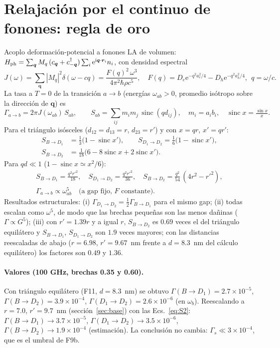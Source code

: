 \documentclass[11pt,a4paper]{article}
\newcommand{\ee}{\mathrm{e}}
\newcommand{\ii}{\mathrm{i}}
\newcommand{\wb}{\omega_b}
\DeclareMathOperator{\sinc}{sinc}
\begin{document}
\section{Relajación por el continuo de fonones: regla de oro}\label{sec:continuo}
Acoplo deformación-potencial a fonones LA de volumen:
$H_{\rm ph}=\sum_{\bm q}M_q\,(c_{\bm q}+c_{-\bm q}^\dagger)\sum_i\ee^{\ii\bm q\cdot\bm r_i}n_i$, con densidad espectral
\begin{equation}
J(\omega)=\sum_{\bm q}|M_q|^2\delta(\omega-cq)=\frac{F(q)^2\,\omega^3}{4\pi^2\hbar\rho c^5},\quad
F(q)=D_e\ee^{-q^2a_e^2/4}-D_h\ee^{-q^2a_h^2/4},\ \ q=\omega/c .
\end{equation}
La tasa a $T=0$ de la transición $a\to b$ (energías $\omega_{ab}>0$, promedio isótropo sobre la dirección de $\bm q$) es
\begin{equation}
\Gamma_{a\to b}=2\pi J(\omega_{ab})\,S_{ab},\qquad
S_{ab}=\sum_{ij}m_im_j\,\sinc(qd_{ij}),\quad m_i=a_ib_i,\quad\sinc x=\tfrac{\sin x}{x}. \label{eq:golden}
\end{equation}
Para el triángulo isósceles ($d_{12}=d_{13}=r$, $d_{23}=r'$) y con $x=qr$, $x'=qr'$:
\begin{align}
S_{B\to D_1}&=\tfrac13\big(1-\sinc x'\big),\qquad
S_{D_1\to D_2}=\tfrac16\big(1-\sinc x'\big),\nonumber\\
S_{B\to D_2}&=\tfrac1{18}\big(6-8\sinc x+2\sinc x'\big). \label{eq:S}
\end{align}
Para $qd\ll1$ ($1-\sinc x\simeq x^2/6$):
\begin{gather}
S_{B\to D_1}=\frac{q^2r'^2}{18},\quad S_{D_1\to D_2}=\frac{q^2r'^2}{36},\quad
S_{B\to D_2}=\frac{q^2}{54}\,(4r^2-r'^2),\nonumber\\
\Gamma_{a\to b}\propto\omega_{ab}^{5}\quad\text{(a gap fijo, }F\text{ constante)}.\label{eq:S2}
\end{gather}
Resultados estructurales: (i) $\Gamma_{D_1\to D_2}=\tfrac12\Gamma_{B\to D_1}$ para el mismo gap; (ii) todas escalan como $\omega^5$,
de modo que las brechas pequeñas son las menos dañinas ($\Gamma\propto G^5$); (iii) con $r'=1.39r$ y a igual $r$, $S_{B\to D_2}$ es $0.69$ veces el del triángulo equilátero y $S_{B\to D_1}$, $S_{D_1\to D_2}$ son $1.9$ veces mayores; con las distancias reescaladas de abajo ($r=6.98$, $r'=9.67$~nm frente a $d=8.3$~nm del cálculo equilátero) los factores son $0.49$ y $1.36$.

\paragraph{Valores (100 GHz, brechas 0.35 y 0.60).}
Con triángulo equilátero (F11, $d=8.3$~nm) se obtuvo $\Gamma(B\to D_1)=2.7\times10^{-5}$, $\Gamma(B\to D_2)=3.9\times10^{-4}$, $\Gamma(D_1\to D_2)=2.6\times10^{-6}$ (en $\wb$).
Reescalando a $r=7.0$, $r'=9.7$~nm (sección~\ref{sec:base}) con las Ecs.~\eqref{eq:S2}: $\Gamma(B\to D_1)\to3.7\times10^{-5}$, $\Gamma(D_1\to D_2)\to3.5\times10^{-6}$,
$\Gamma(B\to D_2)\to1.9\times10^{-4}$ (estimación). La conclusión no cambia: $\Gamma_s\ll3\times10^{-4}$, que es el umbral de F9b.
\end{document}
